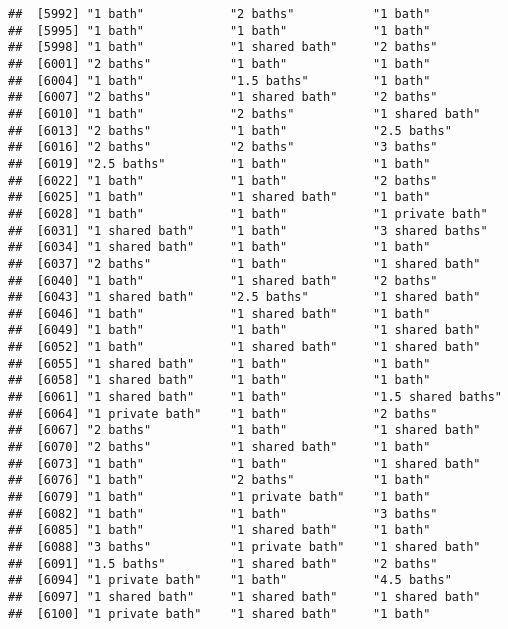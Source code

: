 \documentclass[
]{article}
\begin{document}
\begin{verbatim}
##  [5992] "1 bath"            "2 baths"           "1 bath"           
##  [5995] "1 bath"            "1 bath"            "1 bath"           
##  [5998] "1 bath"            "1 shared bath"     "2 baths"          
##  [6001] "2 baths"           "1 bath"            "1 bath"           
##  [6004] "1 bath"            "1.5 baths"         "1 bath"           
##  [6007] "2 baths"           "1 shared bath"     "2 baths"          
##  [6010] "1 bath"            "2 baths"           "1 shared bath"    
##  [6013] "2 baths"           "1 bath"            "2.5 baths"        
##  [6016] "2 baths"           "2 baths"           "3 baths"          
##  [6019] "2.5 baths"         "1 bath"            "1 bath"           
##  [6022] "1 bath"            "1 bath"            "2 baths"          
##  [6025] "1 bath"            "1 shared bath"     "1 bath"           
##  [6028] "1 bath"            "1 bath"            "1 private bath"   
##  [6031] "1 shared bath"     "1 bath"            "3 shared baths"   
##  [6034] "1 shared bath"     "1 bath"            "1 bath"           
##  [6037] "2 baths"           "1 bath"            "1 shared bath"    
##  [6040] "1 bath"            "1 shared bath"     "2 baths"          
##  [6043] "1 shared bath"     "2.5 baths"         "1 shared bath"    
##  [6046] "1 bath"            "1 shared bath"     "1 bath"           
##  [6049] "1 bath"            "1 bath"            "1 shared bath"    
##  [6052] "1 bath"            "1 shared bath"     "1 shared bath"    
##  [6055] "1 shared bath"     "1 bath"            "1 bath"           
##  [6058] "1 shared bath"     "1 bath"            "1 bath"           
##  [6061] "1 shared bath"     "1 bath"            "1.5 shared baths" 
##  [6064] "1 private bath"    "1 bath"            "2 baths"          
##  [6067] "2 baths"           "1 bath"            "1 shared bath"    
##  [6070] "2 baths"           "1 shared bath"     "1 bath"           
##  [6073] "1 bath"            "1 bath"            "1 shared bath"    
##  [6076] "1 bath"            "2 baths"           "1 bath"           
##  [6079] "1 bath"            "1 private bath"    "1 bath"           
##  [6082] "1 bath"            "1 bath"            "3 baths"          
##  [6085] "1 bath"            "1 shared bath"     "1 bath"           
##  [6088] "3 baths"           "1 private bath"    "1 shared bath"    
##  [6091] "1.5 baths"         "1 shared bath"     "2 baths"          
##  [6094] "1 private bath"    "1 bath"            "4.5 baths"        
##  [6097] "1 shared bath"     "1 shared bath"     "1 shared bath"    
##  [6100] "1 private bath"    "1 shared bath"     "1 bath"           

\end{verbatim}
\end{document}
